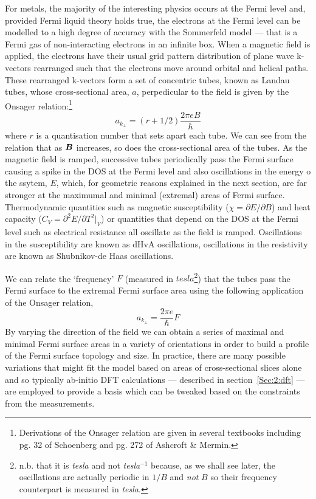For metals, the majority of the interesting physics occurs at the Fermi level and, provided Fermi liquid theory holds true, the electrons at the Fermi level can be modelled to a high degree of accuracy with the Sommerfeld model --- that is a Fermi gas of non-interacting electrons in an infinite box. When a magnetic field is applied, the electrons have their usual grid pattern distribution of plane wave k-vectors rearranged such that the electrons move around orbital and helical paths. These rearranged k-vectors form a set of concentric tubes, known as Landau tubes, whose cross-sectional area, $a$, perpedicular to the field is given by the Onsager relation:\footnote{Derivations of the Onsager relation are given in several textbooks including pg. 32 of Schoenberg\cite{Schoenberg1984} and pg. 272 of Ashcroft \& Mermin\cite{Ashcroft1976}.} 
\begin{equation}
\label{Eqn:2:Onsager}
\textit{a}_{k_{\perp}} = (r + 1/2)\frac{2\pi e B}{\hbar}
\end{equation}
where $r$ is a quantisation number that sets apart each tube. We can see from the relation that as $\boldsymbol{B}$ increases, so does the cross-sectional area of the tubes. As the magnetic field is ramped, successive tubes periodically pass the Fermi surface causing a spike in the \ac{DOS} at the Fermi level and also oscillations in the energy o the ssytem, $E$, which, for geometric reasons explained in the next section, are far stronger at the maximumal and minimal (extremal) areas of Fermi surface. Thermodynamic quantities such as magnetic susceptibility ($\chi = \partial E/\partial B$) and heat capacity ($C_{V} = \partial^2E/\partial T^2|_{V}$) or quantities that depend on the \ac{DOS} at the Fermi level such as electrical resistance all oscillate as the field is ramped. Oscillations in the susceptibility are known as \ac{dHvA} oscillations, oscillations in the resistivity are known as Shubnikov-de Haas oscillations.

 We can relate the `frequency' $F$ (measured in $tesla$\footnote{n.b. that it is \textit{tesla} and not \textit{tesla$^{-1}$} because, as we shall see later, the oscillations are actually periodic in $1/B$ and \textit{not} $B$ so their frequency counterpart is measured in \textit{tesla}.}) that the tubes pass the Fermi surface to the extremal Fermi surface area using the following application of the Onsager relation,
\begin{equation}
\textit{a}_{k_{\perp}} = \frac{2\pi e }{\hbar}F
\end{equation}
By varying the direction of the field we can obtain a series of maximal and minimal Fermi surface areas in a variety of orientations in order to build a profile of the Fermi surface topology and size. In practice, there are many possible variations that might fit the model based on areas of cross-sectional slices alone and so typically ab-initio \ac{DFT} calculations --- described in section~\ref{Sec:2:dft} --- are employed to provide a basis which can be tweaked based on the constraints from the measurements. 

